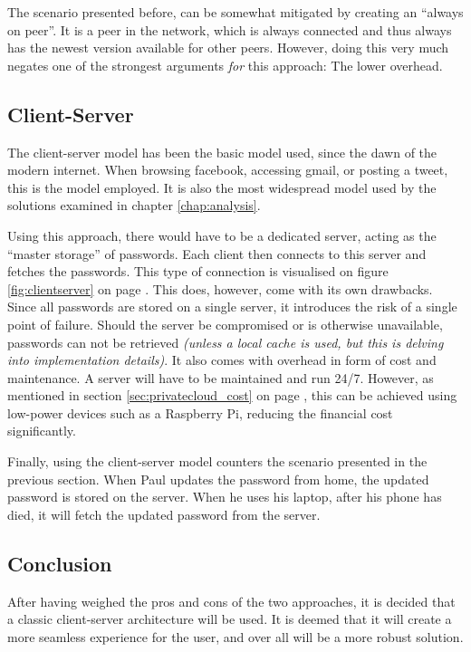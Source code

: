 			The scenario presented before, can be somewhat mitigated by creating an ``always on peer''. It is a peer in the network, which is always connected and thus always has the newest version available for other peers. However, doing this very much negates one of the strongest arguments \emph{for} this approach: The lower overhead.

		\subsection{Client-Server}
			The client-server model has been the basic model used, since the dawn of the modern internet. When browsing facebook, accessing gmail, or posting a tweet, this is the model employed. It is also the most widespread model used by the solutions examined in chapter \ref{chap:analysis}.

			Using this approach, there would have to be a dedicated server, acting as the ``master storage'' of passwords. Each client then connects to this server and fetches the passwords. This type of connection is visualised on figure \ref{fig:clientserver} on page \pageref{fig:clientserver}. This does, however, come with its own drawbacks. Since all passwords are stored on a single server, it introduces the risk of a single point of failure. Should the server be compromised or is otherwise unavailable, passwords can not be retrieved \emph{(unless a local cache is used, but this is delving into implementation details)}. It also comes with overhead in form of cost and maintenance. A server will have to be maintained and run 24/7. However, as mentioned in section \ref{sec:privatecloud_cost} on page \pageref{sec:privatecloud_cost}, this can be achieved using low-power devices such as a Raspberry Pi, reducing the financial cost significantly.

			Finally, using the client-server model counters the scenario presented in the previous section. When Paul updates the password from home, the updated password is stored on the server. When he uses his laptop, after his phone has died, it will fetch the updated password from the server.


		\subsection{Conclusion}
			After having weighed the pros and cons of the two approaches, it is decided that a classic client-server architecture will be used. It is deemed that it will create a more seamless experience for the user, and over all will be a more robust solution.

